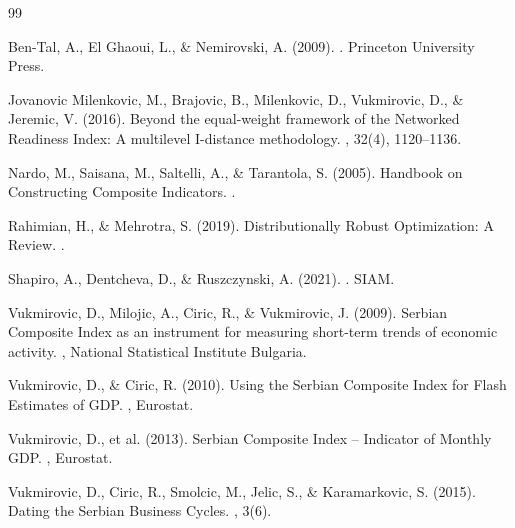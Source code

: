 \documentclass[12pt,a4paper]{article}
\begin{document}

\begin{thebibliography}{99}

Ben-Tal, A., El Ghaoui, L., \& Nemirovski, A. (2009).
.
\newblock Princeton University Press.

Jovanovic Milenkovic, M., Brajovic, B., Milenkovic, D., Vukmirovic, D., \& Jeremic, V. (2016).
\newblock Beyond the equal-weight framework of the Networked Readiness Index: A multilevel I-distance methodology.
, 32(4), 1120--1136.

Nardo, M., Saisana, M., Saltelli, A., \& Tarantola, S. (2005).
\newblock Handbook on Constructing Composite Indicators.
.

Rahimian, H., \& Mehrotra, S. (2019).
\newblock Distributionally Robust Optimization: A Review.
.

Shapiro, A., Dentcheva, D., \& Ruszczynski, A. (2021).
.
\newblock SIAM.

Vukmirovic, D., Milojic, A., Ciric, R., \& Vukmirovic, J. (2009).
\newblock Serbian Composite Index as an instrument for measuring short-term trends of economic activity.
, National Statistical Institute Bulgaria.

Vukmirovic, D., \& Ciric, R. (2010).
\newblock Using the Serbian Composite Index for Flash Estimates of GDP.
, Eurostat.

Vukmirovic, D., et al. (2013).
\newblock Serbian Composite Index -- Indicator of Monthly GDP.
, Eurostat.

Vukmirovic, D., Ciric, R., Smolcic, M., Jelic, S., \& Karamarkovic, S. (2015).
\newblock Dating the Serbian Business Cycles.
, 3(6).

\end{thebibliography}
\end{document}
